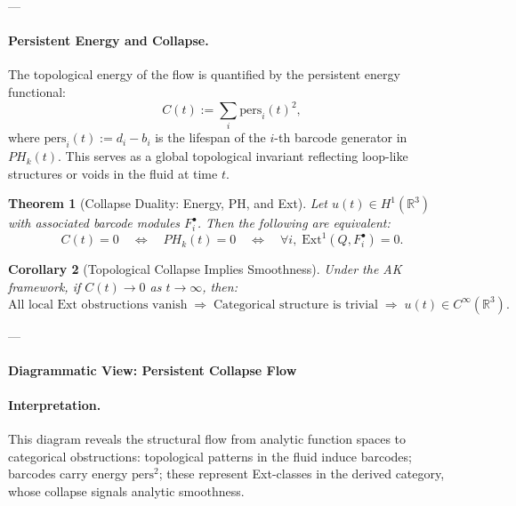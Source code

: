 \documentclass[11pt]{article}
\newtheorem{theorem}{Theorem}[section]
\newtheorem{corollary}[theorem]{Corollary}
\begin{document}
---

\paragraph{Persistent Energy and Collapse.}

The topological energy of the flow is quantified by the persistent energy functional:
\[
C(t) := \sum_{i} \mathrm{pers}_i(t)^2,
\]
where \( \mathrm{pers}_i(t) := d_i - b_i \) is the lifespan of the \( i \)-th barcode generator in \( PH_k(t) \).  
This serves as a global topological invariant reflecting loop-like structures or voids in the fluid at time \( t \).

\begin{theorem}[Collapse Duality: Energy, PH, and Ext]
Let \( u(t) \in H^1(\mathbb{R}^3) \) with associated barcode modules \( F^\bullet_i \). Then the following are equivalent:
\[
C(t) = 0 
\quad \Longleftrightarrow \quad 
PH_k(t) = 0 
\quad \Longleftrightarrow \quad 
\forall i,\; \mathrm{Ext}^1(Q, F^\bullet_i) = 0.
\]
\end{theorem}

\begin{corollary}[Topological Collapse Implies Smoothness]
Under the AK framework, if \( C(t) \to 0 \) as \( t \to \infty \), then:
\[
\text{All local Ext obstructions vanish} 
\;\Rightarrow\; 
\text{Categorical structure is trivial} 
\;\Rightarrow\; 
u(t) \in C^\infty(\mathbb{R}^3).
\]
\end{corollary}

---

\paragraph{Diagrammatic View: Persistent Collapse Flow}

\begin{center}
\end{center}

\paragraph{Interpretation.}
This diagram reveals the structural flow from analytic function spaces to categorical obstructions:  
topological patterns in the fluid induce barcodes; barcodes carry energy \( \text{pers}^2 \);  
these represent Ext-classes in the derived category, whose collapse signals analytic smoothness.
\end{document}
